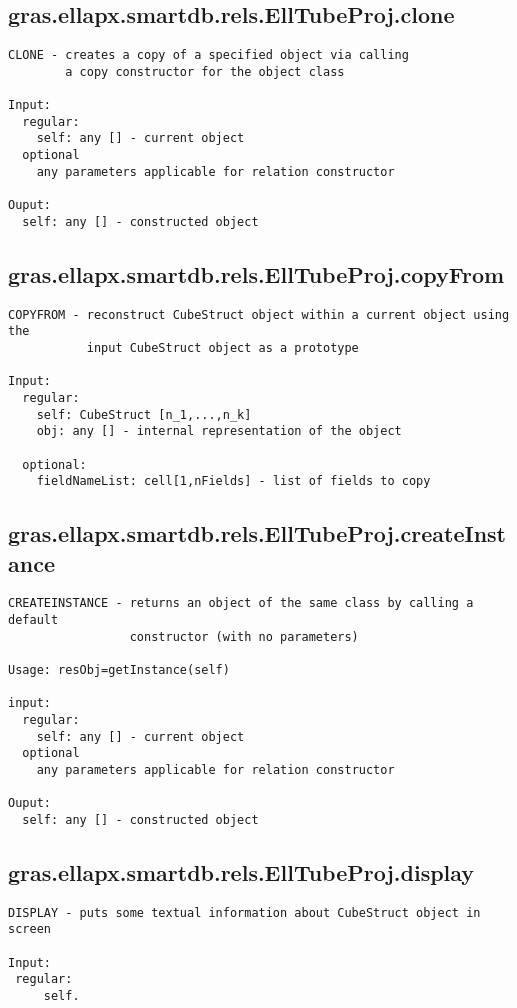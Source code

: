 \subsection{\texorpdfstring{gras.ellapx.smartdb.rels.EllTubeProj.clone}{clone}}\label{method:gras.ellapx.smartdb.rels.EllTubeProj.clone}
\begin{verbatim}
CLONE - creates a copy of a specified object via calling
        a copy constructor for the object class

Input:
  regular:
    self: any [] - current object
  optional
    any parameters applicable for relation constructor

Ouput:
  self: any [] - constructed object
\end{verbatim}
\subsection{\texorpdfstring{gras.ellapx.smartdb.rels.EllTubeProj.copyFrom}{copyFrom}}\label{method:gras.ellapx.smartdb.rels.EllTubeProj.copyFrom}
\begin{verbatim}
COPYFROM - reconstruct CubeStruct object within a current object using the
           input CubeStruct object as a prototype

Input:
  regular:
    self: CubeStruct [n_1,...,n_k]
    obj: any [] - internal representation of the object

  optional:
    fieldNameList: cell[1,nFields] - list of fields to copy
\end{verbatim}
\subsection{\texorpdfstring{gras.ellapx.smartdb.rels.EllTubeProj.createInstance}{createInstance}}\label{method:gras.ellapx.smartdb.rels.EllTubeProj.createInstance}
\begin{verbatim}
CREATEINSTANCE - returns an object of the same class by calling a default
                 constructor (with no parameters)

Usage: resObj=getInstance(self)

input:
  regular:
    self: any [] - current object
  optional
    any parameters applicable for relation constructor

Ouput:
  self: any [] - constructed object
\end{verbatim}
\subsection{\texorpdfstring{gras.ellapx.smartdb.rels.EllTubeProj.display}{display}}\label{method:gras.ellapx.smartdb.rels.EllTubeProj.display}
\begin{verbatim}
DISPLAY - puts some textual information about CubeStruct object in screen

Input:
 regular:
     self.
\end{verbatim}
